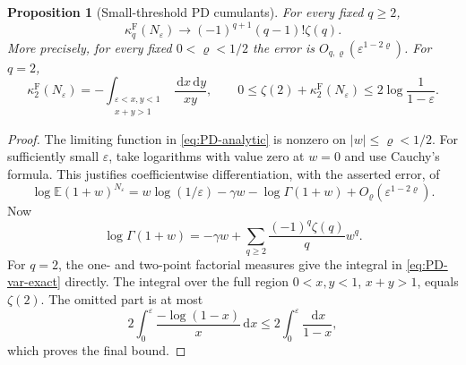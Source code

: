 \documentclass[11pt]{article}
\numberwithin{equation}{section}
\newcommand{\E}{\mathbb E}
\newcommand{\dd}{\,\mathrm d}
\newcommand{\eps}{\varepsilon}
\newtheorem{proposition}[theorem]{Proposition}
\theoremstyle{definition}
\theoremstyle{remark}
\begin{document}
\begin{proposition}[Small-threshold PD cumulants]\label{prop:PD-cumulants}
For every fixed $q\ge2$,
\begin{equation}\label{eq:PD-cumulant-limit}
 \kappa_q^{\mathrm F}(N_\eps)
 \longrightarrow(-1)^{q+1}(q-1)!\zeta(q).
\end{equation}
More precisely, for every fixed $0<\varrho<1/2$ the error is
$O_{q,\varrho}(\eps^{1-2\varrho})$.
For $q=2$,
\begin{equation}\label{eq:PD-var-exact}
 \kappa_2^{\mathrm F}(N_\eps)
 =-\int_{\substack{\eps<x,y<1\\x+y>1}}\frac{\dd x\dd y}{xy},
 \qquad
 0\le\zeta(2)+\kappa_2^{\mathrm F}(N_\eps)
 \le2\log\frac1{1-\eps}.
\end{equation}
\end{proposition}
\begin{proof}
The limiting function in \eqref{eq:PD-analytic} is nonzero on
$|w|\le\varrho<1/2$.  For sufficiently small $\eps$, take logarithms with
value zero at $w=0$ and use Cauchy's formula.  This justifies
coefficientwise differentiation, with the asserted error, of
\[
 \log\E(1+w)^{N_\eps}
 =w\log(1/\eps)-\gamma w-\log\Gamma(1+w)
  +O_\varrho(\eps^{1-2\varrho}).
\]
Now
\[
 \log\Gamma(1+w)
 =-\gamma w+\sum_{q\ge2}\frac{(-1)^q\zeta(q)}q w^q.
\]
For $q=2$, the one- and two-point factorial measures give the integral in
\eqref{eq:PD-var-exact} directly.  The integral over the full region
$0<x,y<1$, $x+y>1$, equals $\zeta(2)$.
The omitted part is at most
\[
 2\int_0^\eps\frac{-\log(1-x)}x\dd x
 \le2\int_0^\eps\frac{\dd x}{1-x},
\]
which proves the final bound.
\end{proof}
\end{document}
